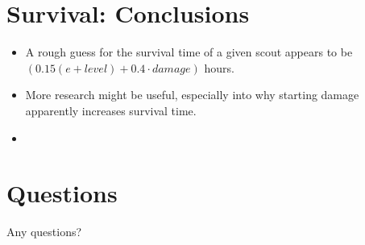 \documentclass{beamer}
\begin{document}
\section{Survival: Conclusions}
\begin{frame}
  \begin{itemize}
  \item A rough guess for the survival time of a given scout appears to be $(0.15(e+level)+0.4\cdot damage)$ hours.
  \item More research might be useful, especially into why starting damage apparently increases survival time.
  \item 
  \end{itemize}
\end{frame}

\section{Questions}
\begin{frame}
\centering
  
  {\Huge Any questions?}


\end{frame}
\end{document}
